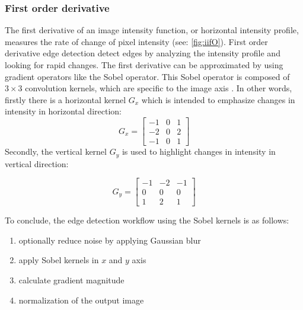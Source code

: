 \subsubsection*{First order derivative}
The first derivative of an image intensity function, or horizontal intensity profile,
measures the rate of change of pixel intensity (see: \cref{fig:iifO}).
First order derivative edge detection detect edges by analyzing the intensity profile and looking for rapid changes.
The first derivative can be approximated by using gradient operators like the Sobel operator.
This Sobel operator is composed of $3 \times 3$ convolution kernels,
which are specific to the image axis \cite{gonzalezDigitalImageProcessing2007}.
In other words, firstly there is a horizontal kernel $G_{x}$ which is intended to emphasize changes in
intensity in horizontal direction:
\begin{equation}
	G_{x} =
	\begin{bmatrix}
		-1 & 0 & 1 \\
		-2 & 0 & 2 \\
		-1 & 0 & 1
	\end{bmatrix}
\end{equation}
\noindent
Secondly, the vertical kernel $G_{y}$ is used to highlight changes in intensity in vertical direction:

\begin{equation}
	G_{y} =
	\begin{bmatrix}
		-1 & -2 & -1 \\
		0  & 0  & 0  \\
		1  & 2  & 1
	\end{bmatrix}
\end{equation}

\noindent
To conclude, the edge detection workflow using the Sobel kernels is as follows:
\begin{enumerate}
	\item optionally reduce noise by applying Gaussian blur
	\item apply Sobel kernels in $x$ and $y$ axis
	\item calculate gradient magnitude %
	\item normalization of the output image
\end{enumerate}

